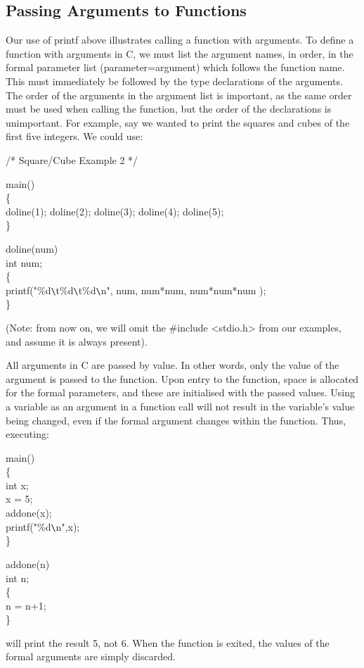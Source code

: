 \subsection{Passing Arguments to Functions}

Our use of {\cd printf} above illustrates calling a function with
arguments. To define a  function with  arguments in  C, we  must list
the argument names, in order, in  the {\kc formal  parameter list} 
(parameter=argument) which  follows the function name.  This must 
immediately be followed by the type declarations of the arguments. 
The order  of the arguments in the argument list is important, as the
same order must be used when calling the function, but the order of
the declarations is  unimportant. For  example, say we wanted to
print the squares and cubes of the first five integers. We could use:
\begin{code}   
/* Square/Cube Example 2 */ \addVspace
   
 main() \\
 \{ \\
  \>  doline(1); doline(2); doline(3); doline(4); doline(5); \\
 \} \addVspace
   
 doline(num) \\
 \> int num; \\
 \{ \\
  \> printf("\%d\verb+\+t\%d\verb+\+t\%d\verb+\+n", num, num*num, num*num*num ); \\
 \}
\end{code}
\noindent
 (Note: from  now on,  we  will  omit  the  {\cd \#include  <stdio.h>}
from  our examples, and assume it is always present).

  All arguments in C are {\kc passed by value}. In other words,
only the value of the argument  is passed  to the function. Upon
entry to the function, space is allocated for the formal parameters,
and these are initialised with the passed values. Using  a variable
as an argument in a function call will not result in the variable's
value being changed, even if the formal argument changes within the
function. Thus, executing:
\begin{code}
 main() \\
 \{ \\
	\> int x; \\
	\> x = 5; \\
	\> addone(x); \\
	\> printf("\%d\verb+\+n",x); \\
	\} \addVspace

 addone(n) \\
 \> int n; \\
 \{ \\
  \> n = n+1; \\
 \}
\end{code}
\noindent
 will print  the result  5, not 6. When the function is exited,
the values of the formal arguments are simply discarded.

